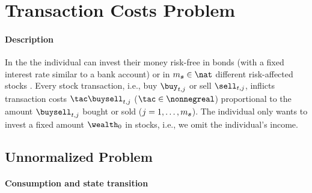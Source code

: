 \section{Transaction Costs Problem}
\label{sec:83problem}


\vspace{-1.5em}

\paragraph{Description}

In the 
the individual can invest their money risk-free in bonds
(with a fixed interest rate similar to a bank account)
or in $m_{\vstock} \in \nat$ different risk-affected stocks
\cite{Schober18Solving}.
Every stock transaction,
i.e., buy $\buy_{t,j}$ or sell $\sell_{t,j}$,
inflicts transaction costs $\tac \buysell_{t,j}$ ($\tac \in \nonnegreal$)
proportional to the amount $\buysell_{t,j}$ bought or sold
($j = 1, \dotsc, m_{{\boldsymbol{s}}}$).
The individual only wants to invest a fixed
amount $\wealth_0$ in stocks, i.e., we omit the individual's income.



\subsection{Unnormalized Problem}
\label{sec:831unnormalized}

\paragraph{Consumption and state transition}

